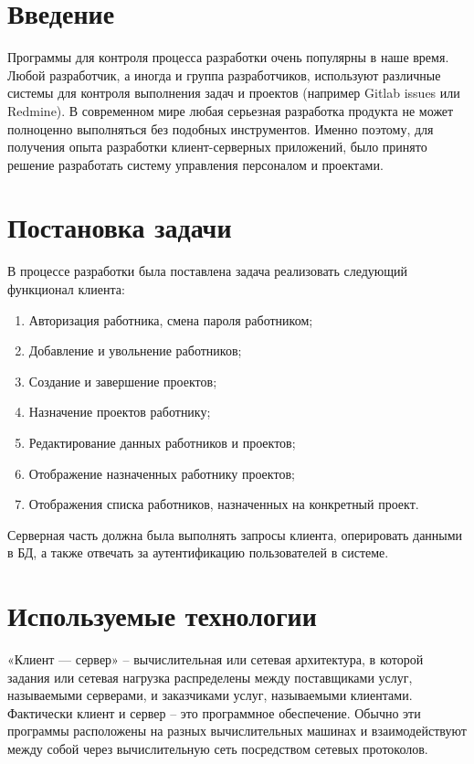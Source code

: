 \documentclass[14pt,a4paper,openbib]{extarticle}
\numberwithin{equation}{section}
\begin{document}
\pagebreak
\section*{Введение}
Программы для контроля процесса разработки очень популярны в наше время. Любой разработчик, а иногда и группа разработчиков, используют различные системы для контроля выполнения задач и проектов (например Gitlab issues или Redmine). В современном мире любая серьезная разработка продукта не может полноценно выполняться без подобных инструментов. Именно поэтому, для получения опыта разработки клиент-серверных приложений, было принято решение разработать систему управления персоналом и проектами.


\newpage
\section{Постановка задачи}
В процессе разработки была поставлена задача реализовать следующий функционал клиента:
\begin{enumerate} 
    \item Авторизация работника, смена пароля работником;
    \item Добавление и увольнение работников;
    \item Создание и завершение проектов;
    \item Назначение проектов работнику;
    \item Редактирование данных работников и проектов;
    \item Отображение назначенных работнику проектов;
    \item Отображения списка работников, назначенных на конкретный проект.
\end{enumerate}
Серверная часть должна была выполнять запросы клиента, оперировать данными в БД, а также отвечать за аутентификацию пользователей в системе.


\newpage
\section{Используемые технологии}
«Клиент — сервер» – вычислительная или сетевая архитектура, в которой задания или сетевая нагрузка распределены между поставщиками услуг, называемыми серверами, и заказчиками услуг, называемыми клиентами. Фактически клиент и сервер – это программное обеспечение. Обычно эти программы расположены на разных вычислительных машинах и взаимодействуют между собой через вычислительную сеть посредством сетевых протоколов.
\end{document}
